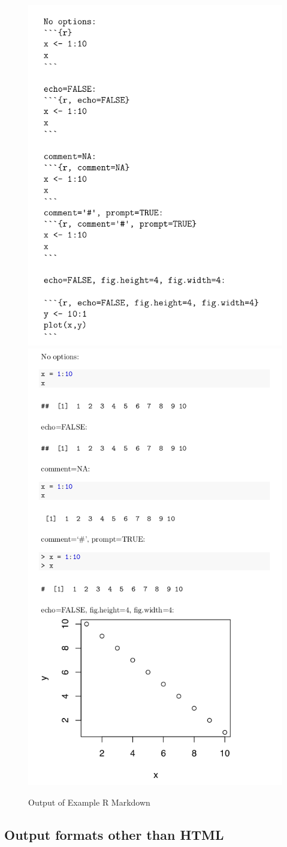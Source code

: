\documentclass[]{krantz}
\theoremstyle{definition}
\theoremstyle{definition}
\theoremstyle{definition}
\theoremstyle{remark}
\begin{document}
\begin{figure}

{\centering \includegraphics[width=0.5\linewidth]{03-scripts/03-images/chunks1} \includegraphics[width=0.5\linewidth]{03-scripts/03-images/chunks2} 

}

\caption{Output of Example R Markdown}\label{fig:chunk}
\end{figure}

\subsection{Output formats other than
HTML}\label{output-formats-other-than-html}
\end{document}
